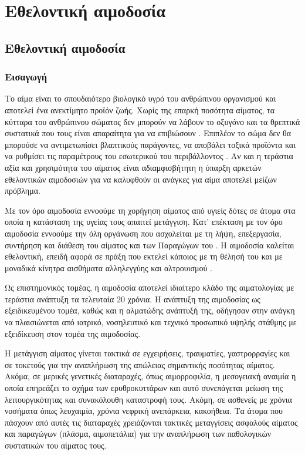 \chapter{Εθελοντική αιμοδοσία}\label{ch:Βlood Donations}

\section{Εθελοντική αιμοδοσία}
	\subsection{Εισαγωγή}
	Το αίμα είναι το σπουδαιότερο βιολογικό υγρό του ανθρώπινου οργανισμού και αποτελεί ένα ανεκτίμητο προϊόν ζωής. Χωρίς της επαρκή ποσότητα αίματος, τα κύτταρα του ανθρώπινου σώματος δεν μπορούν να λάβουν το οξυγόνο και τα θρεπτικά συστατικά που τους είναι απαραίτητα για να επιβιώσουν \cite{aboutBlood}. Επιπλέον το σώμα δεν θα μπορούσε να αντιμετωπίσει βλαπτικούς παράγοντες, να αποβάλει τοξικά προϊόντα και να ρυθμίσει τις παραμέτρους του εσωτερικού του περιβάλλοντος \cite{circulatorySystem}. Αν και η τεράστια αξία και χρησιμότητα του αίματος είναι αδιαμφισβήτητη η ύπαρξη αρκετών εθελοντικών αιμοδοσιών για να καλυφθούν οι ανάγκες για αίμα αποτελεί μείζων πρόβλημα.
	
	Με τον όρο αιμοδοσία εννοούμε τη χορήγηση αίματος από υγιείς δότες σε άτομα στα
οποία η κατάσταση της υγείας τους απαιτεί μετάγγιση. Κατ' επέκταση με τον όρο αιμοδοσία εννοούμε την όλη οργάνωση που ασχολείται με τη λήψη, επεξεργασία, συντήρηση και διάθεση του αίματος και των Παραγώγων του \cite{bloodDonationDefinition}. Η αιμοδοσία καλείται εθελοντική, επειδή αφορά σε πράξη που εκτελεί κάποιος με τη θέλησή του και με μοναδικά κίνητρα αισθήματα αλληλεγγύης και αλτρουισμού \cite{1973}. 

Ως επιστημονικός τομέας, η αιμοδοσία αποτελεί ιδιαίτερο κλάδο της αιματολογίας με τεράστια ανάπτυξη τα τελευταία 20 χρόνια. Η ανάπτυξη της αιμοδοσίας ως εξειδικευμένου τομέα, καθώς και η αλματώδης ανάπτυξή της, οδήγησαν στην ανάγκη να πλαισιώνεται από ιατρικό, νοσηλευτικό και τεχνικό προσωπικό υψηλής στάθμης με εξειδίκευση στον τομέα της
αιμοδοσίας.  
	
	Η μετάγγιση αίματος γίνεται τακτικά σε εγχειρήσεις, τραυματίες, γαστρορραγίες και σε τοκετούς για την αναπλήρωση της απώλειας σημαντικής ποσότητας αίματος. Ακόμα, σε μερικές γενετικές διαταραχές, όπως αιμορροφιλία, η μεσογειακή αναιμία η οποία επηρεάζει το σχήμα των ερυθροκυττάρων και αυτό συνεπάγεται μείωση της λειτουργικότητας και συνακόλουθη καταστροφή τους. Ακόμη, σε ασθενείς με χρόνια νοσήματα όπως λευχαιμία, χρόνια νεφρική ανεπάρκεια, κακοήθεια. Τα άτομα που πάσχουν από αυτές τις διαταραχές χρειάζονται τακτικές μεταγγίσεις ασφαλούς αίματος και παραγώγων (πλάσμα, αιμοπετάλια) για την αναπλήρωση των παθολογικών συστατικών του αίματος τους.
	
